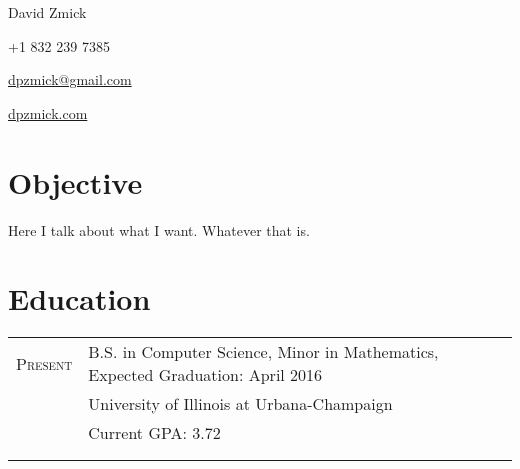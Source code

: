 \documentclass[letterpaper,10pt]{article}
\begin{document}
\begin{center}
    {\Large David Zmick}

    +1 832 239 7385

    \href{mailto:dpzmick@gmail.com}{dpzmick@gmail.com}

    \href{http://dpzmick.com}{dpzmick.com}


\end{center}

\section{Objective}
Here I talk about what I want. Whatever that is.\\

\section{Education}
\begin{tabular}{rl}
	\textsc{Present}    & B.S. in Computer Science, Minor in Mathematics, Expected Graduation: April 2016\\
                        & University of Illinois at Urbana-Champaign\\
                        & Current GPA: 3.72\\
    \\\multicolumn{1}{c}{}\\
\end{tabular}
\end{document}
